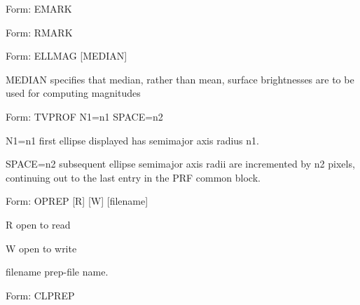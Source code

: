 {\newpage\clearpage
{}%
\begin{command}
  \item[Form: EMARK\hfill]{}
\end{command}%
\lthtmlfigureZ
\lthtmlcheckvsize\clearpage}

{\newpage\clearpage
{}%
\begin{command}
  \item[Form: RMARK\hfill]{}
\end{command}%
\lthtmlfigureZ
\lthtmlcheckvsize\clearpage}

{\newpage\clearpage
{}%
\begin{command}
  \item[Form: ELLMAG {[MEDIAN]}\hfill]{}
  \item[MEDIAN]{specifies that median, rather than mean, surface
       brightnesses are to be used for computing magnitudes}
\end{command}%
\lthtmlfigureZ
\lthtmlcheckvsize\clearpage}

{\newpage\clearpage
{}%
\begin{command}
  \item[Form: TVPROF N1=n1 SPACE=n2\hfill]{}
  \item[N1=n1]{first ellipse displayed has semimajor axis radius n1.}
  \item[SPACE=n2]{subsequent ellipse semimajor axis radii are incremented
       by n2 pixels, continuing out to the last entry in the PRF common
       block.}
\end{command}%
\lthtmlfigureZ
\lthtmlcheckvsize\clearpage}

{\newpage\clearpage
{}%
\begin{command}
  \item[Form: OPREP {[R]} {[W]} {[filename]}\hfill]{}
  \item[R]{open to read}
  \item[W]{open to write}
  \item[filename]{prep-file name.}
\end{command}%
\lthtmlfigureZ
\lthtmlcheckvsize\clearpage}

{\newpage\clearpage
{}%
\begin{command}
  \item[Form: CLPREP\hfill]{}
\end{command}%
\lthtmlfigureZ
\lthtmlcheckvsize\clearpage}

